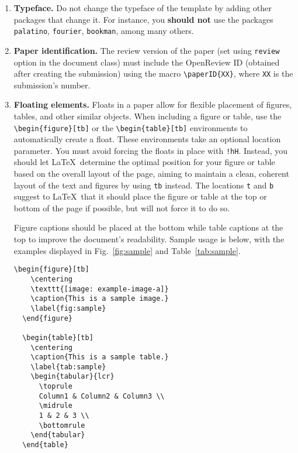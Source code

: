 \documentclass[abstract]{nldl}
\begin{document}
\begin{enumerate}[leftmargin=*]

\item \textbf{Typeface.}
Do not change the typeface of the template by adding other packages that change it.
For instance, you \textbf{should not} use the packages \verb|palatino|, \verb|fourier|, \verb|bookman|, among many others.

\item \textbf{Paper identification.}
The review version of the paper (set using \verb|review| option in the document class) must include the OpenReview ID (obtained after creating the submission) using the macro \verb|\paperID{XX}|, where \verb|XX| is the submission's number.

\item \textbf{Floating elements.}
Floats in a paper allow for flexible placement of figures, tables, and other similar objects.
When including a figure or table, use the \verb|\begin{figure}[tb]| or the \verb|\begin{table}[tb]| environments to automatically create a float.
These environments take an optional location parameter.
You must avoid forcing the floats in place with \verb|!hH|.
Instead, you should let \LaTeX\ determine the optimal position for your figure or table based on the overall layout of the page, aiming to maintain a clean, coherent layout of the text and figures by using \verb|tb| instead.
The locations \verb|t| and \verb|b| suggest to \LaTeX\ that it should place the figure or table at the top or bottom of the page if possible, but will not force it to do so.

Figure captions should be placed at the bottom while table captions at the top to improve the document's readability.
Sample usage is below, with the examples displayed in Fig.~\ref{fig:sample} and Table~\ref{tab:sample}.
\begin{lstlisting}[gobble=2]
  \begin{figure}[tb]
    \centering
    \texttt{[image: example-image-a]}
    \caption{This is a sample image.}
    \label{fig:sample}
  \end{figure}

  \begin{table}[tb]
    \centering
    \caption{This is a sample table.}
    \label{tab:sample}
    \begin{tabular}{lcr}
      \toprule
      Column1 & Column2 & Column3 \\
      \midrule
      1 & 2 & 3 \\
      \bottomrule
    \end{tabular}
  \end{table}
\end{lstlisting}


\end{enumerate}
\end{document}

